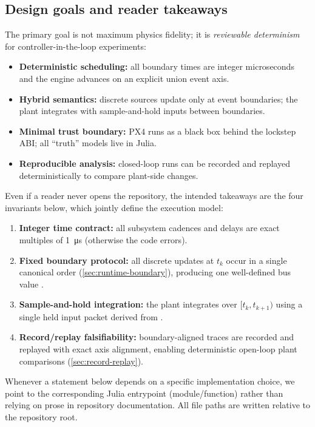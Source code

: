 \subsection{Design goals and reader takeaways}
\label{sec:intro-goals}

The primary goal is not maximum physics fidelity; it is \emph{reviewable determinism} for controller-in-the-loop experiments:
\begin{itemize}[leftmargin=*]
  \item \textbf{Deterministic scheduling:} all boundary times are integer microseconds and the engine advances on an explicit union event axis.
  \item \textbf{Hybrid semantics:} discrete sources update only at event boundaries; the plant integrates with sample-and-hold inputs between boundaries.
  \item \textbf{Minimal trust boundary:} PX4 runs as a black box behind the lockstep ABI; all ``truth'' models live in Julia.
  \item \textbf{Reproducible analysis:} closed-loop runs can be recorded and replayed deterministically to compare plant-side changes.
\end{itemize}

Even if a reader never opens the repository, the intended takeaways are the four invariants below, which jointly define the execution model:
\begin{enumerate}[leftmargin=*]
  \item \textbf{Integer time contract:} all subsystem cadences and delays are exact multiples of \SI{1}{\micro\second} (otherwise the code errors).
  \item \textbf{Fixed boundary protocol:} all discrete updates at $t_k$ occur in a single canonical order (\cref{sec:runtime-boundary}), producing one well-defined bus value .
  \item \textbf{Sample-and-hold integration:} the plant integrates over $[t_k,t_{k+1})$ using a single held input packet derived from .
  \item \textbf{Record/replay falsifiability:} boundary-aligned traces are recorded and replayed with exact axis alignment, enabling deterministic open-loop plant comparisons (\cref{sec:record-replay}).
\end{enumerate}

Whenever a statement below depends on a specific implementation choice, we point to the corresponding Julia entrypoint (module/function) rather than relying on prose in repository documentation. All file paths are written relative to the  repository root.
